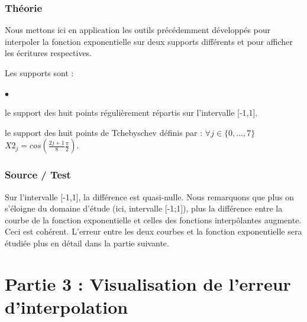 \documentclass[a4paper,10pt]{report}
\begin{document}
\subsection*{Théorie}

Nous mettons ici en application les outils précédemment développés pour interpoler la fonction exponentielle sur deux supports différents et pour afficher les écritures respectives.

Les supports sont :
\begin{list}{}{}
\item \begin{list}{$\bullet$}{}
\item le support des huit points régulièrement répartis sur l’intervalle [-1,1].
\item le support des huit points de Tchebyschev définis par : $\forall j \in \lbrace 0,...,7 \rbrace$  $X2_{j} = cos(\frac{2j+1}{8} \frac{\pi}{2}).$

\end{list}
\end{list}

\newpage
\subsection*{Source / Test}

\begin{center}
%	
\end{center}

\begin{center}
\end{center}
Sur l'intervalle [-1,1], la différence est quasi-nulle.
Nous remarquons que plus on s'éloigne du domaine d'étude (ici, intervalle [-1;1]), plus la différence entre la courbe de la fonction exponentielle et celles des fonctions interpôlantes augmente. Ceci est cohérent. L'erreur entre les deux courbes et la fonction exponentielle sera étudiée plus en détail dans la partie suivante.

\chapter*{Partie 3 : Visualisation de l’erreur d’interpolation}
\end{document}

